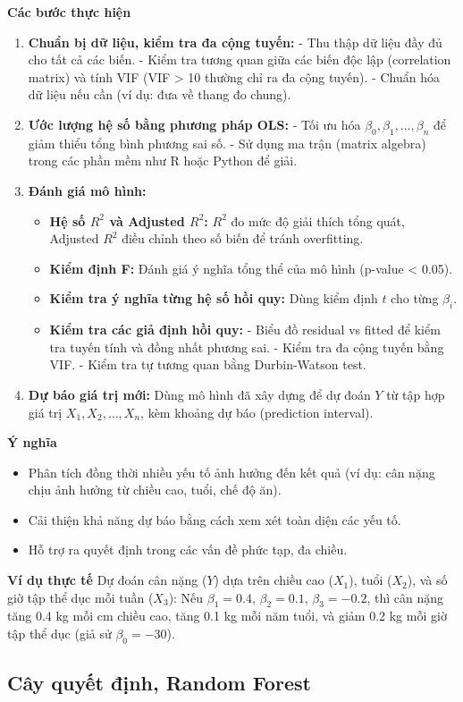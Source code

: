 \documentclass[a4paper,12pt]{article}
\begin{document}
\textbf{Các bước thực hiện}  
\begin{enumerate}
    \item \textbf{Chuẩn bị dữ liệu, kiểm tra đa cộng tuyến:}  
    - Thu thập dữ liệu đầy đủ cho tất cả các biến.  
    - Kiểm tra tương quan giữa các biến độc lập (correlation matrix) và tính VIF (VIF > 10 thường chỉ ra đa cộng tuyến).  
    - Chuẩn hóa dữ liệu nếu cần (ví dụ: đưa về thang đo chung).  
    \item \textbf{Ước lượng hệ số bằng phương pháp OLS:}  
    - Tối ưu hóa \(\beta_0, \beta_1, \dots, \beta_n\) để giảm thiểu tổng bình phương sai số.  
    - Sử dụng ma trận (matrix algebra) trong các phần mềm như R hoặc Python để giải.  
    \item \textbf{Đánh giá mô hình:}  
    \begin{itemize}
        \item \textbf{Hệ số \(R^2\) và Adjusted \(R^2\):} \(R^2\) đo mức độ giải thích tổng quát, Adjusted \(R^2\) điều chỉnh theo số biến để tránh overfitting.  
        \item \textbf{Kiểm định F:} Đánh giá ý nghĩa tổng thể của mô hình (p-value < 0.05).  
        \item \textbf{Kiểm tra ý nghĩa từng hệ số hồi quy:} Dùng kiểm định \(t\) cho từng \(\beta_i\).  
        \item \textbf{Kiểm tra các giả định hồi quy:}  
        - Biểu đồ residual vs fitted để kiểm tra tuyến tính và đồng nhất phương sai.  
        - Kiểm tra đa cộng tuyến bằng VIF.  
        - Kiểm tra tự tương quan bằng Durbin-Watson test.  
    \end{itemize}
    \item \textbf{Dự báo giá trị mới:} Dùng mô hình đã xây dựng để dự đoán \(Y\) từ tập hợp giá trị \(X_1, X_2, \dots, X_n\), kèm khoảng dự báo (prediction interval).  
\end{enumerate}

\textbf{Ý nghĩa}  
\begin{itemize}
    \item Phân tích đồng thời nhiều yếu tố ảnh hưởng đến kết quả (ví dụ: cân nặng chịu ảnh hưởng từ chiều cao, tuổi, chế độ ăn).  
    \item Cải thiện khả năng dự báo bằng cách xem xét toàn diện các yếu tố.  
    \item Hỗ trợ ra quyết định trong các vấn đề phức tạp, đa chiều.  
\end{itemize}


\textbf{Ví dụ thực tế}  
Dự đoán cân nặng (\(Y\)) dựa trên chiều cao (\(X_1\)), tuổi (\(X_2\)), và số giờ tập thể dục mỗi tuần (\(X_3\)): Nếu \(\beta_1 = 0.4\), \(\beta_2 = 0.1\), \(\beta_3 = -0.2\), thì cân nặng tăng 0.4 kg mỗi cm chiều cao, tăng 0.1 kg mỗi năm tuổi, và giảm 0.2 kg mỗi giờ tập thể dục (giả sử \(\beta_0 = -30\)).
\subsection{Cây quyết định, Random Forest}
\end{document}

